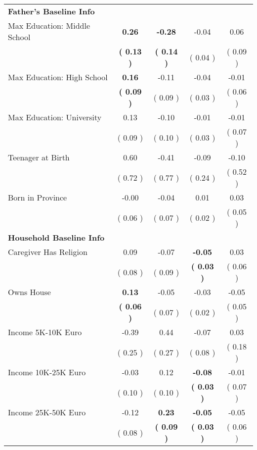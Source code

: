 \begin{table}[H]
{\begin{tabular}{lcccc}
\midrule
\textbf{Father's Baseline Info} \\
\quad Max Education: Middle School & \textbf{     0.26} & \textbf{    -0.28} &     -0.04 &      0.06 \\
\quad  & \textbf{(     0.13 )} & \textbf{(     0.14 )}  & (     0.04 )  & (     0.09 )  \\
\quad Max Education: High School & \textbf{     0.16} &     -0.11 &     -0.04 &     -0.01 \\
\quad  & \textbf{(     0.09 )} & (     0.09 )  & (     0.03 )  & (     0.06 )  \\
\quad Max Education: University &      0.13 &     -0.10 &     -0.01 &     -0.01 \\
\quad  & (     0.09 ) & (     0.10 )  & (     0.03 )  & (     0.07 )  \\
\quad Teenager at Birth &      0.60 &     -0.41 &     -0.09 &     -0.10 \\
\quad  & (     0.72 ) & (     0.77 )  & (     0.24 )  & (     0.52 )  \\
\quad Born in Province &     -0.00 &     -0.04 &      0.01 &      0.03 \\
\quad  & (     0.06 ) & (     0.07 )  & (     0.02 )  & (     0.05 )  \\
\midrule
\textbf{Household Baseline Info} \\
\quad Caregiver Has Religion &      0.09 &     -0.07 & \textbf{    -0.05} &      0.03 \\
\quad  & (     0.08 ) & (     0.09 )  & \textbf{(     0.03 )}  & (     0.06 )  \\
\quad Owns House & \textbf{     0.13} &     -0.05 &     -0.03 &     -0.05 \\
\quad  & \textbf{(     0.06 )} & (     0.07 )  & (     0.02 )  & (     0.05 )  \\
\quad Income 5K-10K Euro &     -0.39 &      0.44 &     -0.07 &      0.03 \\
\quad  & (     0.25 ) & (     0.27 )  & (     0.08 )  & (     0.18 )  \\
\quad Income 10K-25K Euro &     -0.03 &      0.12 & \textbf{    -0.08} &     -0.01 \\
\quad  & (     0.10 ) & (     0.10 )  & \textbf{(     0.03 )}  & (     0.07 )  \\
\quad Income 25K-50K Euro &     -0.12 & \textbf{     0.23} & \textbf{    -0.05} &     -0.05 \\
\quad  & (     0.08 ) & \textbf{(     0.09 )}  & \textbf{(     0.03 )}  & (     0.06 )  \\

\end{tabular}}
\end{table}
